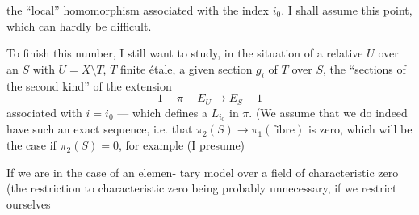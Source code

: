 the ``local'' homomorphism
associated with the index $i_0$. I shall assume
this point, which can hardly be difficult.


To finish this number, I still want
to study, in the situation of a
relative  $U$ over an $S$ with
 $U=X\setminus T$,  $T$ finite étale, a given section
$g_i$ of $T$ over $S$, the ``sections of
the second kind'' of the extension
\[
1-\pi-E_U\longrightarrow E_S-1
\]
associated with $i=i_0$ --- which defines a   
$L_{i_0}$ in $\pi$. (We assume that we
do indeed have such an exact sequence, i.e. that
$\pi_2(S)\longrightarrow\pi_1(\text{fibre})$ is zero, which will be
the case if $\pi_2(S)=0$, for example (I presume)


If we are in the case of an elemen-
tary model over a field of characteristic
zero (the restriction to characteristic zero
being probably unnecessary, if we restrict ourselves
